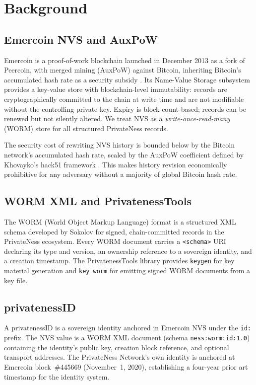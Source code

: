 \documentclass[11pt,a4paper]{article}
\theoremstyle{definition}
\begin{document}
\section{Background}
\label{sec:background}

\subsection{Emercoin NVS and AuxPoW}

Emercoin is a proof-of-work blockchain launched in December 2013 as a fork of
Peercoin, with merged mining (AuxPoW) against Bitcoin, inheriting Bitcoin's
accumulated hash rate as a security subsidy \cite{emercoin}.  Its Name-Value
Storage subsystem provides a key-value store
with blockchain-level immutability: records are cryptographically committed to
the chain at write time and are not modifiable without the controlling private
key.  Expiry is block-count-based; records can be renewed but not silently
altered.  We treat NVS as a \emph{write-once-read-many} (WORM) store for all
structured PrivateNess records.

The security cost of rewriting NVS history is bounded below by the Bitcoin
network's accumulated hash rate, scaled by the AuxPoW coefficient defined by
Khovayko's hack51 framework \cite{hack51}.  This makes history revision
economically prohibitive for any adversary without a majority of global Bitcoin
hash rate.

\subsection{WORM XML and PrivatenessTools}

The WORM (World Object Markup Language) format is a structured XML schema
developed by Sokolov \cite{privatenesstools} for signed, chain-committed
records in the PrivateNess ecosystem.  Every WORM document carries a
\texttt{<schema>} URI declaring its type and version, an ownership reference
to a sovereign identity, and a creation timestamp.  The PrivatenessTools
library provides \texttt{keygen} for key material generation and \texttt{key
worm} for emitting signed WORM documents from a key file.

\subsection{privatenessID}

A privatenessID is a sovereign identity anchored in Emercoin NVS under the
\texttt{id:} prefix.  The NVS value is a WORM XML document (schema
\texttt{ness:worm:id:1.0}) containing the identity's public key, creation
block reference, and optional transport addresses.  The PrivateNess Network's
own identity is anchored at Emercoin block~\#445669 (November~1, 2020), establishing
a four-year prior art timestamp for the identity system.
\end{document}
